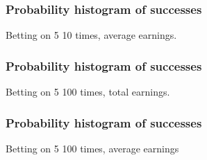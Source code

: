 \documentclass[handout]{beamer}
\begin{document}
   \begin{frame}
   \frametitle{Probability histogram of successes}
   \begin{center}
   \end{center}
   Betting on {\color{red} 5} 10 times, average earnings.
   \end{frame}



   \begin{frame}
   \frametitle{Probability histogram of successes}
   \begin{center}
   \end{center}
   Betting on {\color{red} 5} 100 times,  total earnings.
   \end{frame}



   \begin{frame}
   \frametitle{Probability histogram of successes}
   \begin{center}
   \end{center}
   Betting on {\color{red} 5} 100 times, average earnings
   \end{frame}

\end{document}
